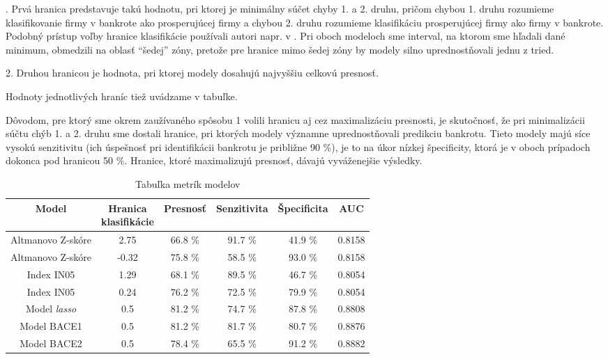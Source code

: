 .	Prvá hranica predstavuje takú hodnotu, pri ktorej je minimálny súčet chyby 1. a 2. druhu, pričom chybou 1. druhu rozumieme klasifikovanie firmy v bankrote ako prosperujúcej firmy a chybou 2. druhu
rozumieme klasifikáciu prosperujúcej firmy ako firmy v bankrote.
Podobný prístup voľby hranice klasifikácie používali autori napr. v \cite{boda, begley, wu}.
Pri oboch modeloch sme interval, na ktorom sme hľadali dané minimum, obmedzili na oblasť “šedej” zóny, pretože pre hranice mimo šedej zóny by modely silno uprednostňovali jednu z tried.

2.	Druhou hranicou je hodnota, pri ktorej modely dosahujú najvyššiu celkovú presnosť.

Hodnoty jednotlivých hraníc tiež uvádzame v tabuľke.

Dôvodom, pre ktorý sme okrem zaužívaného spôsobu 1 volili hranicu aj cez maximalizáciu presnosti, je skutočnosť, že pri minimalizácii súčtu chýb 1. a 2. druhu sme dostali hranice,
pri ktorých modely významne uprednostňovali predikciu bankrotu.
Tieto modely majú síce vysokú senzitivitu (ich úspešnosť pri identifikácii bankrotu je približne 90 \%), je to na úkor nízkej špecificity, ktorá je v oboch prípadoch dokonca pod hranicou 50 \%.
Hranice, ktoré maximalizujú presnosť, dávajú vyváženejšie výsledky.

\bigskip

\begin{table}
    \begin{tabular}{ cc|cccc }
        Model & \makecell{Hranica \\ klasifikácie} & Presnosť & Senzitivita & Špecificita & AUC \\
        \hline
        Altmanovo Z-skóre & 2.75 & 66.8 \% & 91.7 \% & 41.9 \% & 0.8158 \\
        Altmanovo Z-skóre & -0.32 & 75.8 \% & 58.5 \% & 93.0 \% & 0.8158 \\
        Index IN05 & 1.29 & 68.1 \% & 89.5 \% & 46.7 \% & 0.8054 \\
        Index IN05 & 0.24 & 76.2 \% & 72.5 \% & 79.9 \% & 0.8054 \\
        Model \emph{lasso} & 0.5 & 81.2 \% & 74.7 \% & 87.8 \% & 0.8808 \\
        Model BACE1 & 0.5 & 81.2 \% & 81.7 \% & 80.7 \% & 0.8876 \\
        Model BACE2 & 0.5 & 78.4 \% & 65.5 \% & 91.2 \% & 0.8882 \\
    \end{tabular}
    \caption{Tabuľka metrík modelov}
    \label{tabulka_metrik}
\end{table}

